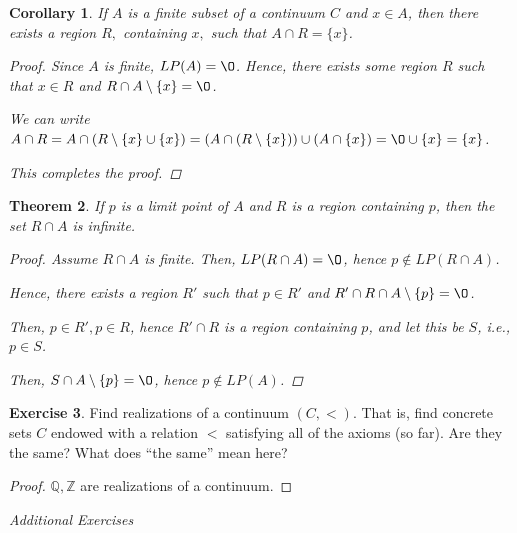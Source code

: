 \documentclass[11pt]{article}
\newcommand{\bbQ}{\mathbb{Q}}
\newcommand{\bbZ}{\mathbb{Z}}
\renewcommand{\emptyset}{\O}
\renewcommand{\_}[1]{\underline{ #1 }}
\newtheorem{theorem}{Theorem}[section]
\newtheorem{corollary}[theorem]{Corollary}
\theoremstyle{definition}
\newtheorem{exercise}[theorem]{Exercise}
\numberwithin{equation}{subsection}
\begin{document}
\begin{corollary}  If $A$ is a finite subset of a continuum $C$ and $x \in A$, then there exists a region $R,$ containing $x,$ such that $A \cap R = \{ x \}$.

\begin{proof}
Since $A$ is finite, $LP(A) = \emptyset$. Hence, there exists some region $R$ such that $x \in R$ and $R \cap A\setminus\{x\} = \emptyset$.

We can write $A \cap R = A \cap (R \setminus \{x\} \cup \{x\}) = (A \cap (R \setminus \{x\})) \cup (A \cap \{x\}) = \emptyset \cup \{x\} = \{x\}$.

This completes the proof.

\renewcommand\qedsymbol{QED}
\end{proof}

\end{corollary}


\begin{theorem}  If $p$ is a limit point of $A$ and $R$ is a region containing $p$, then the set $R \cap A$ is infinite.

\begin{proof}
Assume $R \cap A$ is finite. Then, $LP(R \cap A) = \emptyset$, hence $p \notin LP(R \cap A)$. 

Hence, there exists a region $R'$ such that $p \in R'$ and $R' \cap R \cap A \setminus \{p\} = \emptyset$.

Then, $p\in R', p\in R$, hence $R' \cap R$ is a region containing $p$, and let this be $S$, i.e., $p \in S$.

Then, $S \cap A \setminus \{p\} = \emptyset$, hence $p \notin LP(A)$.

\renewcommand\qedsymbol{QED}
\end{proof}

\end{theorem}

\begin{exercise}  Find realizations of a continuum $(C, <)$.  That is, find concrete sets $C$ endowed with a relation $<$ satisfying all of the axioms (so far).  Are they the same?  What does ``the same'' mean here?
\begin{proof}
$\bbQ, \bbZ$ are realizations of a continuum. 

\renewcommand\qedsymbol{QED}
\end{proof}

\end{exercise}
\bigskip

\begin{center}
{\em Additional Exercises}
\end{center} 
\end{document}

